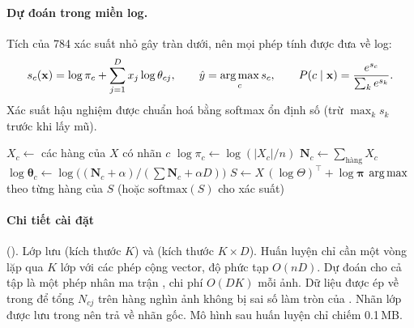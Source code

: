 \paragraph{Dự đoán trong miền log.} Tích của 784 xác suất nhỏ gây tràn dưới, nên mọi phép tính được đưa về log:
\begin{equation}
s_c(\mathbf{x})=\log\pi_c+\sum_{j=1}^{D}x_j\log\theta_{cj},\qquad
\hat y=\operatorname*{arg\,max}_c s_c,\qquad
P(c\mid\mathbf{x})=\frac{e^{s_c}}{\sum_{k}e^{s_k}}.
\end{equation}
Xác suất hậu nghiệm được chuẩn hoá bằng softmax ổn định số (trừ $\max_k s_k$ trước khi lấy mũ).
 
\begin{algorithm}[H]
\caption{Multinomial Naive Bayes}\label{alg:nb}
\begin{algorithmic}[1]
    \State $X_c\gets$ các hàng của $X$ có nhãn $c$
    \State $\log\pi_c\gets\log(|X_c|/n)$
    \State $\mathbf{N}_c\gets\sum_{\text{hàng}}X_c$ 
    \State $\log\boldsymbol\theta_c\gets\log\big((\mathbf{N}_c+\alpha)/(\textstyle\sum\mathbf{N}_c+\alpha D)\big)$
  \EndFor
\EndFunction
{}
  \State $S\gets X\,(\log\Theta)^{\top}+\log\boldsymbol\pi$ 
  \State \Return $\operatorname*{arg\,max}$ theo từng hàng của $S$ \quad (hoặc $\mathrm{softmax}(S)$ cho xác suất)
\EndFunction
\end{algorithmic}
\end{algorithm}
 
\paragraph{Chi tiết cài đặt} ().
Lớp  lưu  (kích thước $K$) và  (kích thước $K\times D$). Huấn luyện chỉ cần một vòng lặp qua $K$ lớp với các phép cộng vector, độ phức tạp $O(nD)$. Dự đoán cho cả tập là một phép nhân ma trận , chi phí $O(DK)$ mỗi ảnh. Dữ liệu được ép về  trong  để tổng $N_{cj}$ trên hàng nghìn ảnh không bị sai số làm tròn của . Nhãn lớp được lưu trong  nên  trả về nhãn gốc. Mô hình sau huấn luyện chỉ chiếm 0.1\,MB.
 
